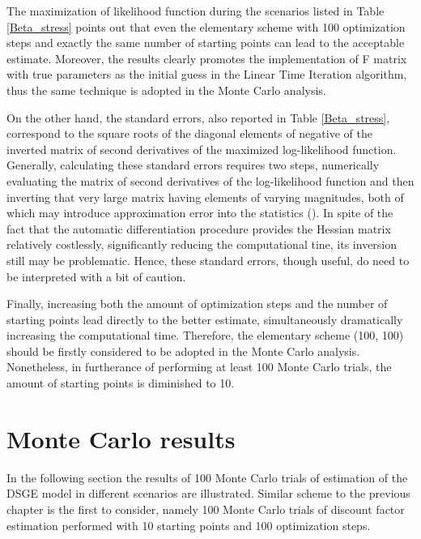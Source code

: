 \documentclass{pracamgr}
\numberwithin{equation}{section}
\begin{document}
The maximization of likelihood function during the scenarios listed in Table \ref{Beta_stress} points out that even the elementary scheme with 100 optimization steps and exactly the same number of starting points can lead to the acceptable estimate. Moreover, the results clearly promotes the implementation of F matrix with true parameters as the initial guess in the Linear Time Iteration algorithm, thus the same technique is adopted in the Monte Carlo analysis.

On the other hand, the standard errors, also reported in Table \ref{Beta_stress}, correspond to the square roots of the diagonal elements of negative of the inverted matrix of second derivatives of the maximized log-likelihood function. Generally, calculating these standard errors requires two steps, numerically evaluating the matrix of second derivatives of the log-likelihood function and then inverting that very large matrix having elements of varying magnitudes, both of which may introduce approximation error into the statistics (\citet{iskrev2008evaluating}). In spite of the fact that the automatic differentiation procedure provides the Hessian matrix relatively costlessly, significantly reducing the computational tine, its inversion still may be problematic. Hence, these standard errors, though useful, do need to be interpreted with a bit of caution.

Finally, increasing both the amount of optimization steps and the number of starting points lead directly to the better estimate, simultaneously dramatically increasing the computational time. Therefore, the elementary scheme (100, 100) should be firstly considered to be adopted in the Monte Carlo analysis. Nonetheless, in furtherance of performing at least 100 Monte Carlo trials, the amount of starting points is diminished to 10.

\section{Monte Carlo results}

In the following section the results of 100 Monte Carlo trials of estimation of the DSGE model in different scenarios are illustrated. Similar scheme to the previous chapter is the first to consider, namely 100 Monte Carlo trials of discount factor estimation performed with 10 starting points and 100 optimization steps.
\end{document}
